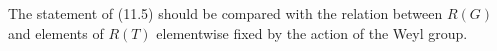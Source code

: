 The statement of (11.5) should be compared with the relation between $R(G)$ and elements of $R(T)$ elementwise fixed by the action of the Weyl group.
